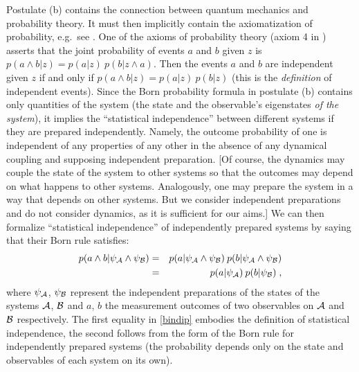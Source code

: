 \documentclass[aps,prl,amsmath,amssymb,twocolumn,nofootinbib]{revtex4}
\theoremstyle{plain}
\theoremstyle{definition}
\theoremstyle{remark}
\def\labell#1{\label{#1}}
\begin{document}
Postulate (b) contains the connection between quantum mechanics
and probability theory. It must then implicitly contain the
axiomatization of probability, e.g.~see
\cite{ballentinepaper,ballentinebook,cox}. One of the axioms of
probability theory (axiom 4 in \cite{ballentinepaper}) asserts that
the joint probability of events $a$ and $b$ given $z$ is
$p(a\wedge b|z)=p(a|z)\:p(b|z\wedge a)$. Then the events $a$ and $b$ are
independent given $z$ if and only if $p(a\wedge b|z)=p(a|z)\:p(b|z)$ (this
is the {\em definition} of independent events). Since the Born
probability formula in postulate (b) contains only quantities of the
system (the state and the observable's eigenstates {\em of the
  system}), it implies the ``statistical independence'' between
different systems if they are prepared independently. Namely, the
outcome probability of one is independent of any properties of any
other in the absence of any dynamical coupling and supposing
independent preparation. [Of course, the dynamics may couple the state
of the system to other systems so that the outcomes may depend on what
happens to other systems.  Analogously, one may prepare the system in
a way that depends on other systems. But we consider independent
preparations and do not consider dynamics, as it is sufficient for our
aims.] We can then formalize ``statistical independence'' of
independently prepared systems by saying that their Born rule
satisfies:
\begin{eqnarray}
  p(a\wedge b|\psi_{\cal A}\wedge \psi_{\cal B})&=&p(a|\psi_{\cal A}\wedge \psi_{\cal
    B})\:p(b|\psi_{\cal A}\wedge \psi_{\cal B})\nonumber\\&=& p(a|\psi_{\cal
    A})\:p(b|\psi_{\cal B})
\labell{bindip}\;,
\end{eqnarray}
where $\psi_{\cal A}$, $\psi_{\cal B}$ represent the independent
preparations of the states of the systems $\cal A$, $\cal B$ and $a$,
$b$ the measurement outcomes of two observables on $\cal A$ and $\cal
B$ respectively. The first equality in \eqref{bindip} embodies the
definition of statistical independence, the second follows from the
form of the Born rule for independently prepared systems (the
probability depends only on the state and observables of each system
on its own).
\end{document}
